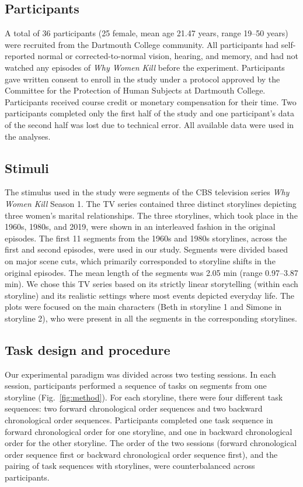 \documentclass[10pt]{article}
\begin{document}
\subsection*{Participants}
A total of 36 participants (25 female, mean age 21.47 years, range 19--50 years) were recruited from the Dartmouth College community. All participants had self-reported normal or corrected-to-normal vision, hearing, and memory, and had not watched any episodes of \textit{Why Women Kill} before the experiment. Participants gave written consent to enroll in the study under a protocol approved by the Committee for the Protection of Human Subjects at Dartmouth College.  Participants received course credit or monetary compensation for their time. Two participants completed only the first half of the study and one participant’s data of the second half was lost due to technical error. All available data were used in the analyses.

\subsection*{Stimuli}
The stimulus used in the study were segments of the CBS television series \textit{Why Women Kill} Season 1. The TV series contained three distinct storylines depicting three women’s marital relationships. The three storylines, which took place in the 1960s, 1980s, and 2019, were shown in an interleaved fashion in the original episodes. The first 11 segments from the 1960s and 1980s storylines, across the first and second episodes, were used in our study. Segments were divided based on major scene cuts, which primarily corresponded to storyline shifts in the original episodes. The mean length of the segments was 2.05 min (range 0.97--3.87 min). We chose this TV series based on its strictly linear storytelling (within each storyline) and its realistic settings where most events depicted everyday life. The plots were focused on the main characters (Beth in storyline 1 and Simone in storyline 2), who were present in all the segments in the corresponding storylines.

\subsection*{Task design and procedure}
Our experimental paradigm was divided across two testing sessions. In each session, participants performed a sequence of tasks on segments from one storyline (Fig.~\ref{fig:method}).  For each storyline, there were four different task sequences: two forward chronological order sequences and two backward chronological order sequences. Participants completed one task sequence in forward chronological order for one storyline, and one in backward chronological order for the other storyline. The order of the two sessions (forward chronological order sequence first or backward chronological order sequence first), and the pairing of task sequences with storylines, were counterbalanced across participants.
\end{document}
